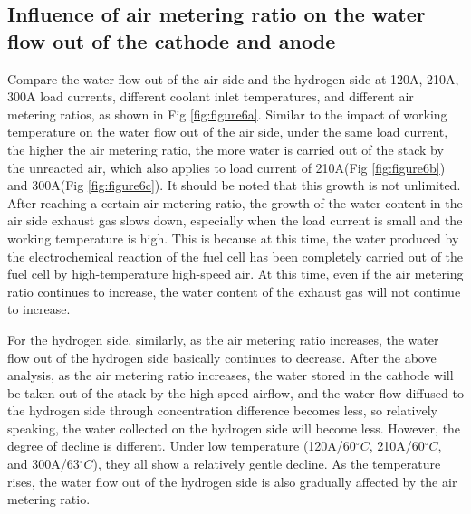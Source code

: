 

\subsection{Influence of air metering ratio on the water flow out of the cathode and anode}

Compare the water flow out of the air side and the hydrogen side at 120A, 210A, 300A load currents, different coolant inlet temperatures, and different air metering ratios, as shown in Fig \ref{fig:figure6a}. Similar to the impact of working temperature on the water flow out of the air side, under the same load current, the higher the air metering ratio, the more water is carried out of the stack by the unreacted air, which also applies to load current of 210A(Fig \ref{fig:figure6b}) and 300A(Fig \ref{fig:figure6c}). It should be noted that this growth is not unlimited. After reaching a certain air metering ratio, the growth of the water content in the air side exhaust gas slows down, especially when the load current is small and the working temperature is high. This is because at this time, the water produced by the electrochemical reaction of the fuel cell has been completely carried out of the fuel cell by high-temperature high-speed air. At this time, even if the air metering ratio continues to increase, the water content of the exhaust gas will not continue to increase.

\par
For the hydrogen side, similarly, as the air metering ratio increases, the water flow out of the hydrogen side basically continues to decrease. After the above analysis, as the air metering ratio increases, the water stored in the cathode will be taken out of the stack by the high-speed airflow, and the water flow diffused to the hydrogen side through concentration difference becomes less, so relatively speaking, the water collected on the hydrogen side will become less. However, the degree of decline is different. Under low temperature (120A/60$^{\circ}C$, 210A/60$^{\circ}C$, and 300A/63$^{\circ}C$), they all show a relatively gentle decline. As the temperature rises, the water flow out of the hydrogen side is also gradually affected by the air metering ratio.

